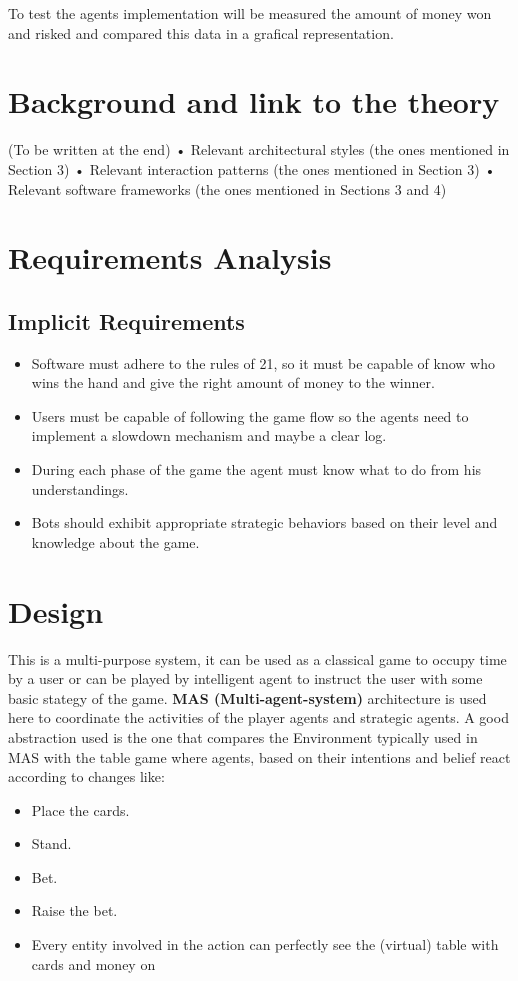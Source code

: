 To test the agents implementation will be measured the amount of money won and risked and compared this data in a grafical representation.

\chapter{Background and link to the theory}

(To be written at the end)
• Relevant architectural styles (the ones mentioned in Section 3)
• Relevant interaction patterns (the ones mentioned in Section 3)
• Relevant software frameworks (the ones mentioned in Sections 3 and 4)


\chapter{Requirements Analysis}

\section{Implicit Requirements}
\begin{itemize}
   \item Software must adhere to the rules of 21, so it must be capable of know who wins the hand and give the right amount of money to the winner.
   \item Users must be capable of following the game flow so the agents need to implement a slowdown mechanism and maybe a clear log.
   \item During each phase of the game the agent must know what to do from his understandings.
   \item Bots should exhibit appropriate strategic behaviors based on their level and knowledge about the game.
\end{itemize}

\chapter{Design}

This is a multi-purpose system, it can be used as a classical game to occupy time by a user or can be played by intelligent agent to instruct the user with some basic stategy of the game. \textbf{MAS (Multi-agent-system)} architecture is used here to coordinate the activities of the player agents and strategic agents. A good abstraction used is the one that compares the Environment typically used in MAS with the table game where agents, based on their intentions and belief react according to changes like: 
\begin{itemize}
    \item Place the cards.
    \item Stand.
    \item Bet.
    \item Raise the bet.
    \item Every entity involved in the action can perfectly see the (virtual) table with cards and money on
 \end{itemize}

